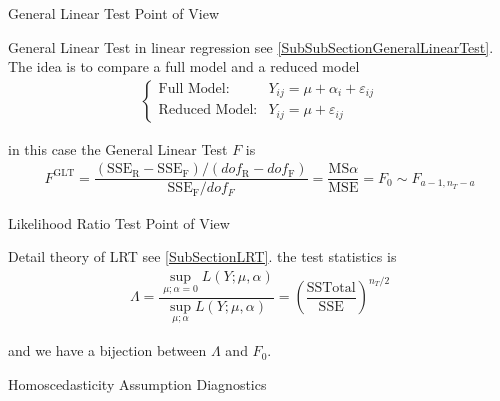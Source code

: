 \begin{point}
    General Linear Test Point of View
\end{point}

General Linear Test in linear regression see \autoref{SubSubSectionGeneralLinearTest}. The idea is to compare a full model and a reduced model
\begin{align*}
    \begin{cases}
        \text{Full Model}:&Y_{ij}=\mu +\alpha _i+\varepsilon _{ij}\\
        \text{Reduced Model}:&Y_{ij}=\mu +\varepsilon _{ij}
    \end{cases} 
\end{align*}

in this case the General Linear Test $ F $ is 
\begin{align*}
    F^\mathrm{ GLT }=\dfrac{(\mathrm{SSE_R-SSE_F})/(dof_\mathrm{R}-dof_\mathrm{F} )}{\mathrm{SSE_F}/dof_F} =\dfrac{ \mathrm{ MS }\alpha   }{ \mathrm{ MSE }  }=F_0\sim F_{a-1,n_T-a}   
\end{align*}

\begin{point}
    Likelihood Ratio Test Point of View
\end{point}

Detail theory of LRT see \autoref{SubSectionLRT}. the test statistics is
\begin{align*}
    \Lambda = \dfrac{{\displaystyle\sup_{\mu;\alpha =0}L(Y;\mu ,\alpha ) }}{{\displaystyle\sup_{\mu;\alpha}L(Y;\mu ,\alpha ) }}=\left(\dfrac{\mathrm{ SSTotal }  }{\mathrm{ SSE }  } \right)^{n_T/2}
\end{align*}

and we have a bijection between $ \Lambda  $ and $ F_0 $.


\begin{point}
    Homoscedasticity Assumption Diagnostics 
\end{point}

